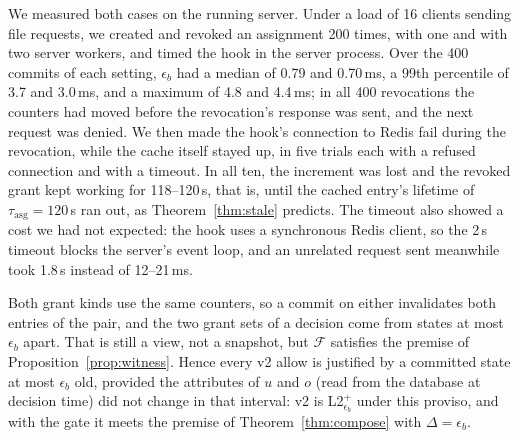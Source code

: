 \documentclass[sigconf,review,anonymous]{acmart}
\begin{document}
We measured both cases on the running server. Under a load of 16 clients sending file requests, we created and
revoked an assignment 200 times, with one and with two server workers, and timed the hook in the server process.
Over the 400 commits of each setting, $\epsilon_b$ had a median of 0.79 and 0.70\,ms, a 99th percentile of 3.7 and
3.0\,ms, and a maximum of 4.8 and 4.4\,ms; in all 400 revocations the counters had moved before the revocation's
response was sent, and the next request was denied. We then made the hook's connection to Redis fail during the
revocation, while the cache itself stayed up, in five trials each with a refused connection and with a timeout.
In all ten, the increment was lost and the revoked grant kept working for 118--120\,s, that is, until the
cached entry's lifetime of $\tau_{\mathrm{asg}}=120$\,s ran out, as Theorem~\ref{thm:stale} predicts. The timeout
also showed a cost we had not expected: the hook uses a synchronous Redis client, so the 2\,s timeout blocks the
server's event loop, and an unrelated request sent meanwhile took 1.8\,s instead of 12--21\,ms.

Both grant kinds use the same counters, so a commit on either invalidates both entries of the pair, and the two
grant sets of a decision come from states at most $\epsilon_b$ apart. That is still a view, not a snapshot, but
$\mathcal{F}$ satisfies the premise of Proposition~\ref{prop:witness}. Hence every v2 allow is justified by a
committed state at most $\epsilon_b$ old, provided the attributes of $u$ and $o$ (read from the database at decision
time) did not change in that interval: v2 is L2$^+_{\epsilon_b}$ under this proviso, and with the gate it meets the
premise of Theorem~\ref{thm:compose} with $\Delta=\epsilon_b$.

\smallskip\noindent{}
\end{document}
